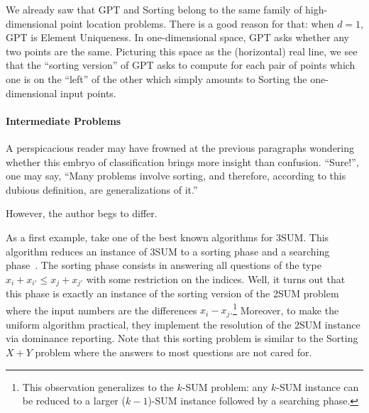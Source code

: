 We already saw that GPT and Sorting belong to the same family of
high-dimensional point location problems. There is a good reason for that: when
\(d=1\), GPT is Element Uniqueness. In one-dimensional space, GPT
asks whether any two points are the same. Picturing this space as
the (horizontal) real line, we see that the ``sorting version'' of GPT asks to
compute for each pair of points which one is on the ``left'' of the other which
simply amounts to Sorting the one-dimensional input points.




\paragraph{Intermediate Problems}
A perspicacious reader may have frowned at the previous paragraphs wondering
whether this embryo of classification brings more insight than confusion.
``Sure!'', one may say, ``Many problems involve sorting, and therefore,
according to this dubious definition, are generalizations of it.''

However, the author begs to differ.

As a first example, take one of the best known algorithms for 3SUM. This
algorithm reduces an instance of 3SUM to a sorting phase and a searching
phase~\cite{GP18}. The sorting phase consists in answering all questions of the type
\( x_i + x_{i'} \le x_j + x_{j'} \) with some restriction on the indices.
Well, it
turns out that this phase is exactly an instance of
the sorting version of the 2SUM problem where the input numbers are the
differences \(x_i - x_j\).\footnote{This observation generalizes to the \(k\)-SUM
problem: any \(k\)-SUM instance can be reduced to a larger (\(k-1\))-SUM instance
followed by a searching phase.} Moreover, to make the uniform algorithm
practical, they implement the resolution of the 2SUM instance via dominance
reporting.
Note that this sorting problem is similar to the Sorting \(X+Y\) problem where
the answers to most questions are not cared for.

